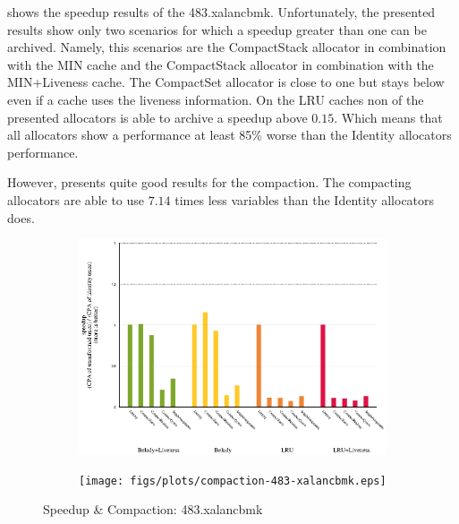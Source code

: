 \documentclass[onecolumn, openright, master, english, signatures]{dbrgrptt}
\begin{document}
 shows the speedup results of the 483.xalancbmk. Unfortunately, the presented results show only two scenarios for which a speedup greater than one can be archived. Namely, this scenarios are the CompactStack allocator in combination with the \ac{MIN} cache and the CompactStack allocator in combination with the \ac{MIN}+Liveness cache. The CompactSet allocator is close to one but stays below even if a cache uses the liveness information. On the \ac{LRU} caches non of the presented allocators is able to archive a speedup above $0.15$. Which means that all allocators show a performance at least 85\% worse than the Identity allocators performance.

However,  presents quite good results for the compaction. The compacting allocators are able to use $7.14$ times less variables than the Identity allocators does.

\begin{figure}[!ht]
  \begin{subfigure}[b]{0.5\textwidth}%
    \includegraphics[width=\textwidth]{figs/plots/speedup-483-xalancbmk.eps}
    \label{fig:speedup-compaction-483-xalancbmk-speedup}
  \end{subfigure}%
  \begin{subfigure}[b]{0.5\textwidth}%
    \texttt{[image: figs/plots/compaction-483-xalancbmk.eps]}
    \label{fig:speedup-compaction-483-xalancbmk-compaction}
  \end{subfigure}%
  \caption{Speedup \& Compaction: 483.xalancbmk}
  \label{fig:speedup-compaction-483-xalancbmk}
\end{figure}
\end{document}

